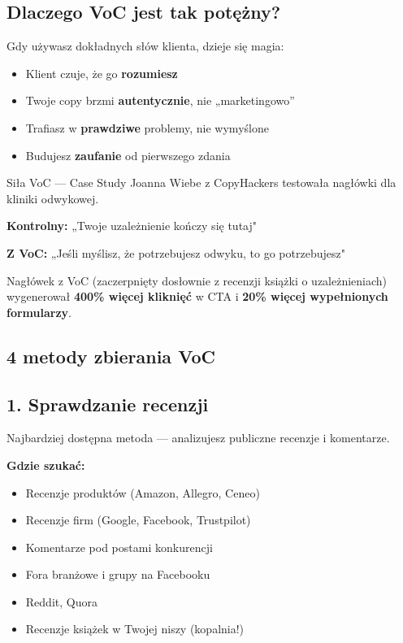 \documentclass[
  12pt,
  a4paper,
  twoside,
  openright,
  12pt,
  DIV=12,
  BCOR=12mm]{scrbook}
\providecommand{\tightlist}{%
  \setlength{\itemsep}{0pt}\setlength{\parskip}{0pt}}\usepackage{longtable,booktabs,array}
\begin{document}
\subsection{Dlaczego VoC jest tak
potężny?}\label{dlaczego-voc-jest-tak-potux119ux17cny}

Gdy używasz dokładnych słów klienta, dzieje się magia:

\begin{itemize}
\tightlist
\item
  Klient czuje, że go \textbf{rozumiesz}
\item
  Twoje copy brzmi \textbf{autentycznie}, nie „marketingowo''
\item
  Trafiasz w \textbf{prawdziwe} problemy, nie wymyślone
\item
  Budujesz \textbf{zaufanie} od pierwszego zdania
\end{itemize}

\begin{przyklad}{Siła VoC --- Case Study}
Joanna Wiebe z CopyHackers testowała nagłówki dla kliniki odwykowej.

\textbf{Kontrolny:} „Twoje uzależnienie kończy się tutaj"

\textbf{Z VoC:} „Jeśli myślisz, że potrzebujesz odwyku, to go potrzebujesz"

Nagłówek z VoC (zaczerpnięty dosłownie z recenzji książki o uzależnieniach) wygenerował \textbf{400\% więcej kliknięć} w CTA i \textbf{20\% więcej wypełnionych formularzy}.
\end{przyklad}

\subsection{4 metody zbierania VoC}\label{metody-zbierania-voc}

\subsection{1. Sprawdzanie recenzji}\label{sprawdzanie-recenzji}

Najbardziej dostępna metoda --- analizujesz publiczne recenzje i
komentarze.

\textbf{Gdzie szukać:}

\begin{itemize}
\tightlist
\item
  Recenzje produktów (Amazon, Allegro, Ceneo)
\item
  Recenzje firm (Google, Facebook, Trustpilot)
\item
  Komentarze pod postami konkurencji
\item
  Fora branżowe i grupy na Facebooku
\item
  Reddit, Quora
\item
  Recenzje książek w Twojej niszy (kopalnia!)
\end{itemize}
\end{document}
